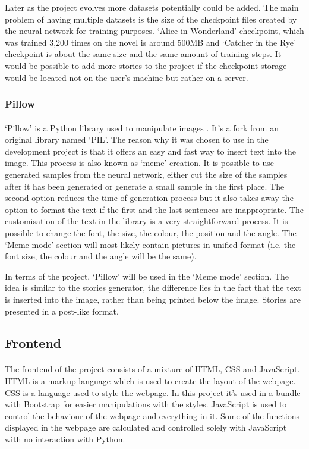 \documentclass[12pt]{report}
\begin{document}
Later as the project evolves more datasets potentially could be added. The main problem of having multiple datasets is the size of the
checkpoint files created by the neural network for training purposes. `Alice in Wonderland' checkpoint, which was trained 3,200 times on the novel
is around 500MB and `Catcher in the Rye' checkpoint is about the same size and the same amount of training steps. It would be possible to add more stories to the
project if the checkpoint storage would be located not on the user's machine but rather on a server.

\subsubsection*{Pillow}
\paragraph{}
`Pillow' is a Python library used to manipulate images \citep{pillow_lib}. It's a fork from an original library named
`PIL'. The reason why it was chosen to use in the development project is that it offers an easy and fast way
to insert text into the image. This process is also known as `meme' creation. It is possible to use generated samples
from the neural network, either cut the size of the samples after it has been generated or generate a small sample 
in the first place. The second option reduces the time of generation process but it also takes away the option
to format the text if the first and the last sentences are inappropriate. The customisation of the text in the library
is a very straightforward process. It is possible to change the font, the size, the colour, the position and the angle.
The `Meme mode' section will most likely contain pictures in unified format (i.e. the font size, the colour and the angle will
be the same).

In terms of the project, `Pillow' will be used in the `Meme mode' section. The idea is similar to the stories generator,
the difference lies in the fact that the text is inserted into the image, rather than being printed below the image.
Stories are presented in a post-like format.


\subsection*{Frontend}
\paragraph{}
The frontend of the project consists of a mixture of HTML, CSS and JavaScript. HTML is a markup language which is used
to create the layout of the webpage. CSS is a language used to style the webpage. In this project it's used in a
bundle with Bootstrap for easier manipulations with the styles. JavaScript is used to control the behaviour of
the webpage and everything in it. Some of the functions displayed in the webpage are calculated and controlled 
solely with JavaScript with no interaction with Python.
\end{document}
